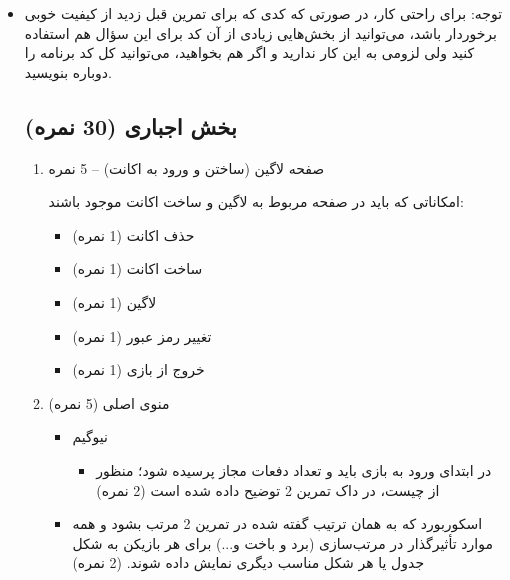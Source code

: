 \documentclass[]{article}
\begin{document}
\begin{itemize}[label = {$\blacksquare$}]

\item
توجه: برای راحتی کار، در صورتی که کدی که برای تمرین قبل زدید از کیفیت خوبی برخوردار باشد، می‌توانید از بخش‌هایی زیادی از آن کد برای این سؤال هم استفاده کنید ولی لزومی به این کار ندارید و اگر هم بخواهید، می‌توانید کل کد برنامه را دوباره بنویسید.

\setcounter{secnumdepth}{1}

\newpage
\subsection{بخش اجباری (30 نمره)}
\begin{enumerate}


\item
صفحه لاگین (ساختن و ورود به اکانت) – 5 نمره

امکاناتی که باید در صفحه مربوط به لاگین و ساخت اکانت موجود باشند:
\begin{itemize}[label = $\circ$]
\item
حذف اکانت (1 نمره)

\item
ساخت اکانت (1 نمره)

\item
لاگین (1 نمره)

\item
تغییر رمز عبور (1 نمره)

\item
خروج از بازی (1 نمره)

\end{itemize}

\item
منوی اصلی (5 نمره)

\begin{itemize}[label = $\circ$]
\item
نیوگیم

\begin{itemize}[label = $\Leftarrow$]
\item
در ابتدای ورود به بازی باید  و تعداد دفعات مجاز  پرسیده شود؛ منظور از  چیست، در داک تمرین 2 توضیح داده شده است (2 نمره)
\end{itemize}



\item
اسکوربورد که به همان ترتیب گفته شده در تمرین 2 مرتب بشود و همه موارد تأثیرگذار در مرتب‌سازی (برد و باخت و...) برای هر بازیکن به شکل جدول یا هر شکل مناسب دیگری نمایش داده شوند. (2 نمره)


\end{itemize}
\end{enumerate}
\end{itemize}
\end{document}
